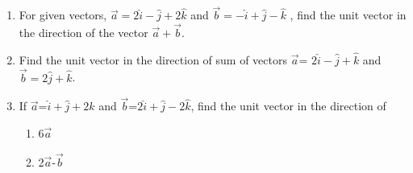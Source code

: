 \begin{enumerate}[label=\thesubsection.\arabic*, ref=\thesubsection.\theenumi]
\item For given vectors,  $\vec{a}=2\hat{i}-\hat{j}+2\hat{k}$ and $\vec{b}=-\hat{i}+\hat{j}-\hat{k}$ ,  find the unit vector in the
direction of the vector $\vec{a}+\vec{b}$.
        \label{prob:12/10/2/9}
\\
    \solution 
		
\item Find the unit vector in the direction of sum of vectors $\vec{a}$= $2\hat{i}-\hat{j}+\hat{k}$  and  $\vec{b}=2\hat{j}+\hat{k}$.
\item If $\vec{a}$=$\hat{i}+\hat{j}+2\hat{k}$  and  $\vec{b}$=$2\hat{i}+\hat{j}-2\hat{k}$,  find the unit vector in the direction of
	\begin{enumerate}
		\item 6$\vec{a}$   
		\item 2$\vec{a}$-$\vec{b}$
	\end{enumerate}


\end{enumerate}
